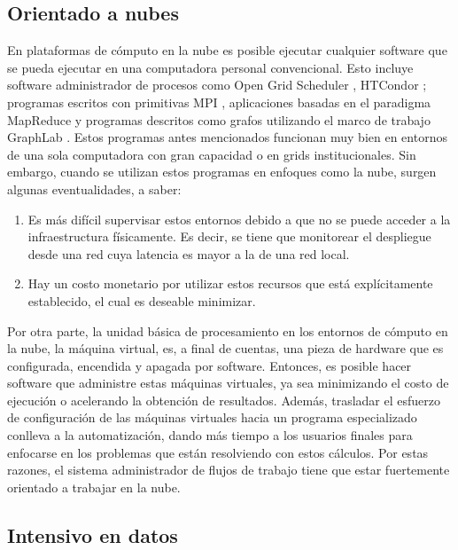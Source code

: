 \subsection{Orientado a nubes}

En plataformas de c\'omputo en la nube es posible ejecutar cualquier software que se pueda ejecutar en una computadora personal convencional. Esto incluye software administrador de procesos como Open Grid Scheduler \cite{univa2016gridengine}, HTCondor \cite{htcondor2014webpage}; programas escritos con primitivas MPI \cite{mpiforum2016mpi}, aplicaciones basadas en el paradigma MapReduce \cite{dean2008mapreduce} y programas descritos como grafos utilizando el marco de trabajo GraphLab \cite{low2014graphlab}. Estos programas antes mencionados funcionan muy bien en entornos de una sola computadora con gran capacidad o en grids institucionales. Sin embargo, cuando se utilizan estos programas en enfoques como la nube, surgen algunas eventualidades, a saber:

\begin{enumerate}
\item Es más difícil supervisar estos entornos debido a que no se puede acceder a la infraestructura físicamente. Es decir, se tiene que monitorear el despliegue desde una red cuya latencia es mayor a la de una red local. 

\item Hay un costo monetario por utilizar estos recursos que está explícitamente establecido, el cual es deseable minimizar. 
\end{enumerate}

Por otra parte, la unidad b\'asica de procesamiento en los entornos de c\'omputo en la nube, la m\'aquina virtual, es, a final de cuentas, una pieza de hardware que es configurada, encendida y apagada por software. Entonces, es posible hacer software que administre estas m\'aquinas virtuales, ya sea minimizando el costo de ejecuci\'on o acelerando la obtenci\'on de resultados. Adem\'as, trasladar el esfuerzo de configuraci\'on de las m\'aquinas virtuales hacia un programa especializado conlleva a la automatizaci\'on, dando m\'as tiempo a los usuarios finales para enfocarse en los problemas que est\'an resolviendo con estos c\'alculos. Por estas razones, el sistema administrador de flujos de trabajo tiene que estar fuertemente orientado a trabajar en la nube.


\subsection{Intensivo en datos}

